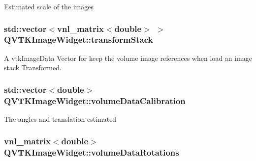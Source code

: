 Estimated scale of the images \hypertarget{class_q_v_t_k_image_widget_a77de3bb5e2ca81b3c66ca5864003d02d}{
\subsubsection[{transform\-Stack}]{\setlength{\rightskip}{0pt plus 5cm}std\-::vector$<$vnl\-\_\-matrix$<$double$>$ $>$ {\bf Q\-V\-T\-K\-Image\-Widget\-::transform\-Stack}}}\label{d8/dd7/class_q_v_t_k_image_widget_a77de3bb5e2ca81b3c66ca5864003d02d}


A vtk\-Image\-Data Vector for keep the volume image references when load an image stack Transformed. 

\hypertarget{class_q_v_t_k_image_widget_ad5069809b7e74c437884499f2aaaf0a0}{
\subsubsection[{volume\-Data\-Calibration}]{\setlength{\rightskip}{0pt plus 5cm}std\-::vector$<$double$>$ {\bf Q\-V\-T\-K\-Image\-Widget\-::volume\-Data\-Calibration}}}\label{d8/dd7/class_q_v_t_k_image_widget_ad5069809b7e74c437884499f2aaaf0a0}
The angles and translation estimated \hypertarget{class_q_v_t_k_image_widget_ab9aba72f9fc8e922555b96f30bd1dba3}{
\subsubsection[{volume\-Data\-Rotations}]{\setlength{\rightskip}{0pt plus 5cm}vnl\-\_\-matrix$<$double$>$ {\bf Q\-V\-T\-K\-Image\-Widget\-::volume\-Data\-Rotations}}}\label{d8/dd7/class_q_v_t_k_image_widget_ab9aba72f9fc8e922555b96f30bd1dba3}



